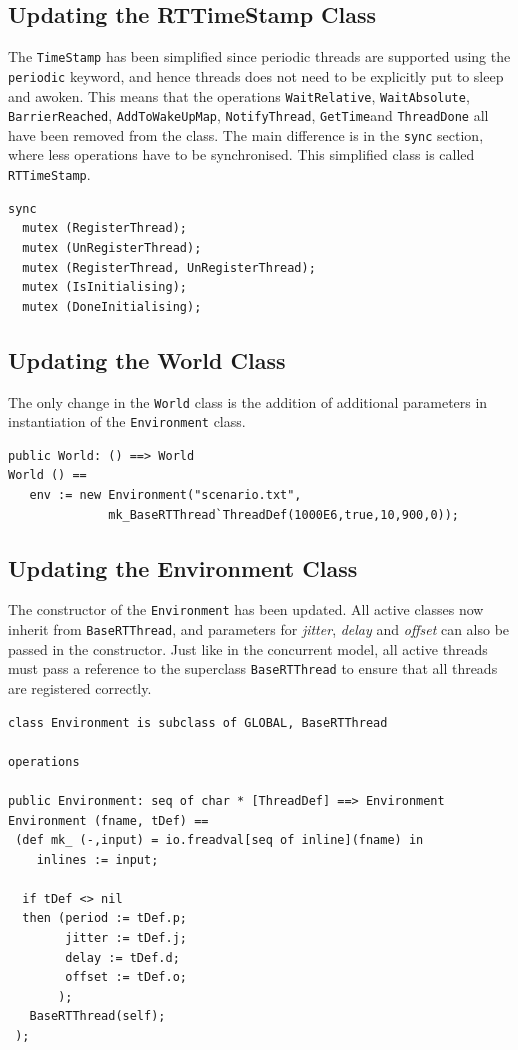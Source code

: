 \documentclass{overturerepchap}
\begin{document}
\subsection{Updating the RTTimeStamp Class}

The \texttt{TimeStamp} has been simplified since periodic threads are supported using the \texttt{periodic} keyword, and hence threads does not need to be explicitly put to sleep and awoken. This means that the operations \texttt{WaitRelative}, \texttt{WaitAbsolute}, \texttt{BarrierReached}, \texttt{AddToWakeUpMap}, \texttt{NotifyThread}, \texttt{GetTime}and \texttt{ThreadDone} all have been removed from the class. The main difference is in the \texttt{sync} section, where less operations have to be synchronised. This simplified class is called \texttt{RTTimeStamp}.

\begin{lstlisting}
sync 
  mutex (RegisterThread);
  mutex (UnRegisterThread); 
  mutex (RegisterThread, UnRegisterThread);
  mutex (IsInitialising);
  mutex (DoneInitialising);
\end{lstlisting}


\subsection{Updating the World Class}

The only change in the \texttt{World} class is the addition of additional parameters in instantiation of the \texttt{Environment} class.

\begin{lstlisting}
public World: () ==> World
World () ==
   env := new Environment("scenario.txt", 
              mk_BaseRTThread`ThreadDef(1000E6,true,10,900,0));
\end{lstlisting}

\subsection{Updating the Environment Class}

The constructor of the \texttt{Environment} has been updated. All active classes now inherit from \texttt{BaseRTThread}, and parameters for \emph{jitter}, \emph{delay} and \emph{offset} can also be passed in the constructor. Just like in the concurrent model, all active threads must pass a reference to the superclass \texttt{BaseRTThread} to ensure that all threads are registered correctly.

\begin{lstlisting}
class Environment is subclass of GLOBAL, BaseRTThread

operations

public Environment: seq of char * [ThreadDef] ==> Environment
Environment (fname, tDef) ==
 (def mk_ (-,input) = io.freadval[seq of inline](fname) in
    inlines := input;
   
  if tDef <> nil
  then (period := tDef.p;
        jitter := tDef.j;
        delay := tDef.d;
        offset := tDef.o;
       ); 
   BaseRTThread(self);
 );
\end{lstlisting}
\end{document}
